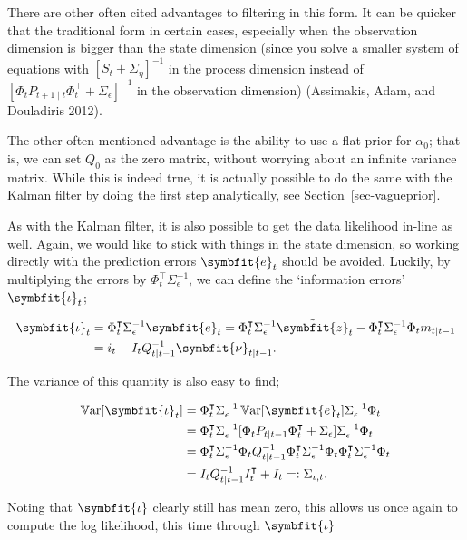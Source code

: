 \documentclass[
]{report}
\DeclareMathOperator{\var}{\mathbb{V}\mathrm{ar}}
\newcommand{\bv}[1]{\symbfit{#1}}
\theoremstyle{plain}
\theoremstyle{plain}
\theoremstyle{remark}
\begin{document}
There are other often cited advantages to filtering in this form. It can
be quicker that the traditional form in certain cases, especially when
the observation dimension is bigger than the state dimension (since you
solve a smaller system of equations with \([S_t + \Sigma_\eta]^{-1}\) in
the process dimension instead of
\([\Phi_t P_{t+1\mid t} \Phi_t^\intercal + \Sigma_\epsilon]^{-1}\) in
the observation dimension) (Assimakis, Adam, and Douladiris 2012).

The other often mentioned advantage is the ability to use a flat prior
for \(\alpha_0\); that is, we can set \(Q_0\) as the zero matrix,
without worrying about an infinite variance matrix. While this is indeed
true, it is actually possible to do the same with the Kalman filter by
doing the first step analytically, see Section~\ref{sec-vagueprior}.

As with the Kalman filter, it is also possible to get the data
likelihood in-line as well. Again, we would like to stick with things in
the state dimension, so working directly with the prediction errors
\(\bv e_t\) should be avoided. Luckily, by multiplying the errors by
\(\Phi_t^\intercal \Sigma_\epsilon^{-1}\), we can define the
`information errors' \(\bv \iota_t\);

\[\begin{split}
  \bv \iota_t &= \Phi_t^\intercal \Sigma_\epsilon^{-1} \bv e_t = \Phi_t^\intercal \Sigma_\epsilon^{-1} \tilde{\bv z}_t -\Phi_t^\intercal \Sigma_\epsilon^{-1}\Phi_t m_{t\mid t-1}\\
  &= i_t - I_tQ_{t\mid t-1}^{-1}\bv \nu_{t\mid t-1}.
\end{split}
\]

The variance of this quantity is also easy to find;

\[\begin{split}
  \var[\bv \iota_t] &= \Phi_t^\intercal \Sigma_\epsilon^{-1}\var[\bv e_t]\Sigma_\epsilon^{-1}\Phi_t\\
  &= \Phi_t^\intercal \Sigma_\epsilon^{-1} [\Phi_{t} P_{t\mid t-1} \Phi_{t}^\intercal + \Sigma_\epsilon] \Sigma_\epsilon^{-1}\Phi_t\\
  &= \Phi_t^\intercal \Sigma_\epsilon^{-1}\Phi_{t} Q_{t\mid t-1}^{-1} \Phi_{t}^\intercal \Sigma_\epsilon^{-1}\Phi_t \Phi_t^\intercal \Sigma_\epsilon^{-1} \Phi_t\\
  &= I_t Q_{t\mid t-1}^{-1} I_t^\intercal + I_t =: \Sigma_{\iota, t}.
\end{split}
\]

Noting that \(\bv \iota\) clearly still has mean zero, this allows us
once again to compute the log likelihood, this time through \(\bv\iota\)
\end{document}

